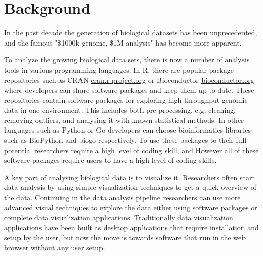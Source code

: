 \section*{Background}

In the past decade the generation of biological datasets has been unprecedented,
and the famous "\$1000k genome, \$1M analysis"\cite{} has become more apparent.


To analyze the growing biological data sets, there is now a number of analysis
tools in various programming languages.\cite{} In R, there are popular package
repositories such as CRAN \url{cran.r-project.org} or Bioconductor
\url{bioconductor.org} where developers can share software packages and keep
them up-to-date.  These repositories contain software packages for exploring
high-throughput genomic data in one environment. This includes both
pre-processing, e.g. cleaning, removing outliers, and analysing it with known
statistical methods. In other languages such as Python or Go developers can
choose bioinformatics libraries such as BioPython\cite{} and biogo\cite{}
respectively.  To use these packages to their full potential researchers require
a high level of coding skill, and 
However all of these software packages require users to have a
high level of coding skills. 

A key part of analysing biological data is to visualize it. Researchers often
start data analysis by using simple visualization techniques to get a quick
overview of the data. Continuing in the data analysis pipeline researchers can
use more advanced visual techniques to explore the data either using
software packages or complete data visualization applications. Traditionally
data visualization applications have been built as desktop applications that
require installation and setup by the user, but now the move is towards software
that run in the web browser without any user setup. 

